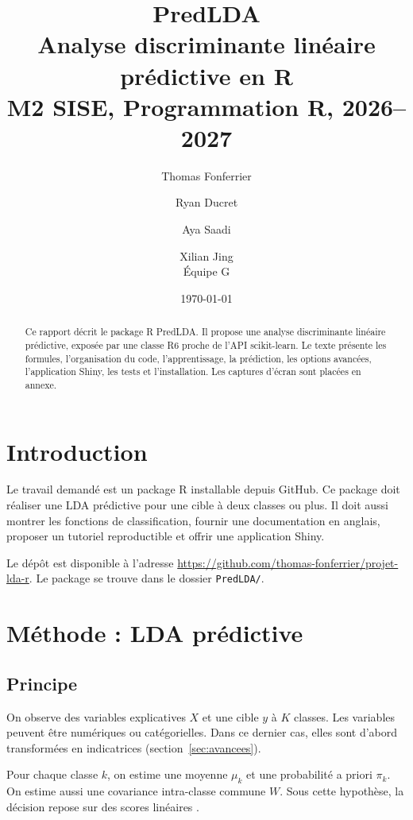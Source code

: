 \documentclass[11pt,a4paper]{article}
\title{PredLDA\\[0.35em]
\large Analyse discriminante lin\'eaire pr\'edictive en R\\[0.25em]
\normalsize M2 SISE, Programmation R, 2026--2027}
\author{
Thomas Fonferrier \and Ryan Ducret \and Aya Saadi \and Xilian Jing\\
\'Equipe G
}
\date{\today}
\begin{document}
\maketitle

\begin{abstract}
Ce rapport d\'ecrit le package R PredLDA. Il propose une analyse
discriminante lin\'eaire pr\'edictive, expos\'ee par une classe R6 proche de
l'API scikit-learn. Le texte pr\'esente les formules, l'organisation du code,
l'apprentissage, la pr\'ediction, les options avanc\'ees, l'application Shiny,
les tests et l'installation. Les captures d'\'ecran sont plac\'ees en annexe.
\end{abstract}

\tableofcontents
\vspace{1em}

\section{Introduction}

Le travail demand\'e est un package R installable depuis GitHub. Ce package doit
r\'ealiser une LDA pr\'edictive pour une cible \`a deux classes ou plus. Il doit
aussi montrer les fonctions de classification, fournir une documentation en
anglais, proposer un tutoriel reproductible et offrir une application Shiny.

Le d\'ep\^ot est disponible \`a l'adresse
\url{https://github.com/thomas-fonferrier/projet-lda-r}.
Le package se trouve dans le dossier \texttt{PredLDA/}.

\section{M\'ethode : LDA pr\'edictive}

\subsection{Principe}

On observe des variables explicatives \(X\) et une cible \(y\) \`a \(K\)
classes. Les variables peuvent \^etre num\'eriques ou cat\'egorielles. Dans ce
dernier cas, elles sont d'abord transform\'ees en indicatrices
(section~\ref{sec:avancees}).

Pour chaque classe \(k\), on estime une moyenne \(\mu_k\) et une probabilit\'e
a priori \(\pi_k\). On estime aussi une covariance intra-classe commune \(W\).
Sous cette hypoth\`ese, la d\'ecision repose sur des scores lin\'eaires
\cite{hastie2009esl}.
\end{document}
